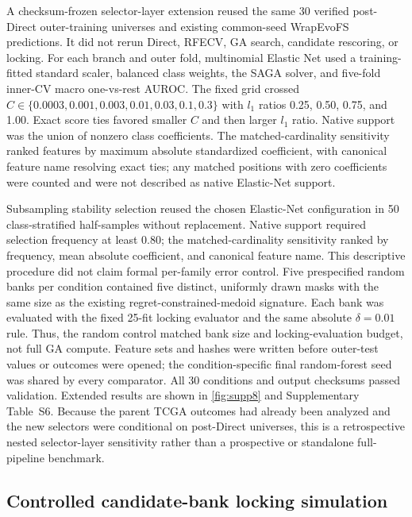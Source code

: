 A checksum-frozen selector-layer extension reused the same 30 verified post-Direct outer-training universes and existing common-seed WrapEvoFS predictions. It did not rerun Direct, RFECV, GA search, candidate rescoring, or locking. For each branch and outer fold, multinomial Elastic Net used a training-fitted standard scaler, balanced class weights, the SAGA solver, and five-fold inner-CV macro one-vs-rest AUROC. The fixed grid crossed $C\in\{0.0003,0.001,0.003,0.01,0.03,0.1,0.3\}$ with $l_1$ ratios 0.25, 0.50, 0.75, and 1.00. Exact score ties favored smaller $C$ and then larger $l_1$ ratio. Native support was the union of nonzero class coefficients. The matched-cardinality sensitivity ranked features by maximum absolute standardized coefficient, with canonical feature name resolving exact ties; any matched positions with zero coefficients were counted and were not described as native Elastic-Net support.

Subsampling stability selection reused the chosen Elastic-Net configuration in 50 class-stratified half-samples without replacement. Native support required selection frequency at least 0.80; the matched-cardinality sensitivity ranked by frequency, mean absolute coefficient, and canonical feature name. This descriptive procedure did not claim formal per-family error control. Five prespecified random banks per condition contained five distinct, uniformly drawn masks with the same size as the existing regret-constrained-medoid signature. Each bank was evaluated with the fixed 25-fit locking evaluator and the same absolute $\delta=0.01$ rule. Thus, the random control matched bank size and locking-evaluation budget, not full GA compute. Feature sets and hashes were written before outer-test values or outcomes were opened; the condition-specific final random-forest seed was shared by every comparator. All 30 conditions and output checksums passed validation. Extended results are shown in \cref{fig:supp8} and Supplementary Table~S6. Because the parent TCGA outcomes had already been analyzed and the new selectors were conditional on post-Direct universes, this is a retrospective nested selector-layer sensitivity rather than a prospective or standalone full-pipeline benchmark.

\subsection{Controlled candidate-bank locking simulation}


